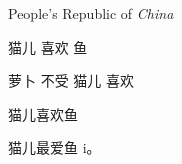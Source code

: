 \documentclass{article}
\newcommand{\PRC}{People's Republic of \emph{China}}
\newcommand{\loves}[2]{#1 喜欢 #2}
\newcommand{\hatedby}[2]{#2 不受 #1 喜欢}
\newcommand{\love}[3][喜欢]{#2#1#3}
\begin{document}
	\PRC
	
	\loves{猫儿}{鱼}
	
	\hatedby{猫儿}{萝卜}
	
	\love{猫儿}{鱼}
	
	\love[最爱]{猫儿}{鱼 i。}
\end{document}
